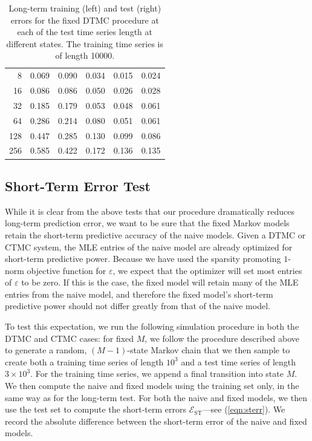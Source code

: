 \documentclass[review,letterpaper,11pt]{elsarticle}
\begin{document}
\begin{table}[tbh]
\begin{tabular}{rrrrrr}
        8           &  0.069 &  0.090 &  0.034 &  0.015 &  0.024 \\
        16          &  0.086 &  0.086 &  0.050 &  0.026 &  0.028 \\
        32          &  0.185 &  0.179 &  0.053 &  0.048 &  0.061 \\
        64          &  0.286 &  0.214 &  0.080 &  0.051 &  0.061 \\
        128         &  0.447 &  0.285 &  0.130 &  0.099 &  0.086 \\
        256         &  0.585 &  0.422 &  0.172 &  0.136 &  0.135 \\
\bottomrule
\end{tabular}
\caption{Long-term training (left) and test (right) errors for the {\color{blue}fixed} DTMC procedure at each of the test time series length at different states. The training time series is of length 10000.}
\label{tab:dtmcLT}
\end{table}

\subsection{Short-Term Error Test}
While it is clear from the above tests that our procedure dramatically reduces long-term prediction error, we want to be sure that the fixed Markov models retain the short-term predictive accuracy of the naive models.  Given a DTMC or CTMC system, the MLE entries of the naive model are already optimized for short-term predictive power.  Because we have used the sparsity promoting $1$-norm objective function for $\varepsilon$, we expect that the optimizer will set most entries of $\varepsilon$ to be zero.  If this is the case, the fixed model will retain many of the MLE entries from the naive model, and therefore the fixed model's short-term predictive power should not differ greatly from that of the naive model.

To test this expectation, we run the following simulation procedure in both the DTMC and CTMC cases: for fixed $M$, we follow the procedure described above to generate a random, $(M-1)$-state Markov chain that we then sample to create both a training time series of length $10^3$ and a test time series of length $3 \times 10^3$.  For the training time series, we append a final transition into state $M$.  We then compute the naive and fixed models using the training set only, in the same way as for the long-term test.  For both the naive and fixed models, we then use the test set to compute the short-term errors $\mathcal{E}_\text{ST}$---see (\ref{eqn:sterr}).  We record the absolute difference between the short-term error of the naive and fixed models.
\end{document}
